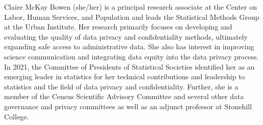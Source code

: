 
Claire McKay Bowen (she/her) is a principal research associate at the Center on Labor, Human Services, and Population and leads the Statistical Methods Group at the Urban Institute. Her research primarily focuses on developing and evaluating the quality of data privacy and confidentiality methods, ultimately expanding safe access to administrative data. She also has interest in improving science communication and integrating data equity into the data privacy process. In 2021, the Committee of Presidents of Statistical Societies identified her as an emerging leader in statistics for her technical contributions and leadership to statistics and the field of data privacy and confidentiality. Further, she is a member of the Census Scientific Advisory Committee and several other data governance and privacy committees as well as an adjunct professor at Stonehill College.